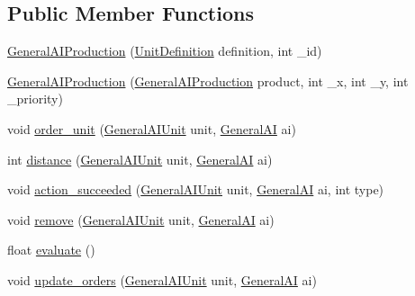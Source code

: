 \subsection*{Public Member Functions}
\begin{DoxyCompactItemize}
\item 
\hyperlink{classai_1_1general_1_1_general_a_i_production_ab1d3fca0db9e7af9a0a9ef09c3bed0a7}{GeneralAIProduction} (\hyperlink{classrts_1_1units_1_1_unit_definition}{UnitDefinition} definition, int \_\-id)
\item 
\hyperlink{classai_1_1general_1_1_general_a_i_production_a8cf7d1c830fd72f02103ab9a39fdf762}{GeneralAIProduction} (\hyperlink{classai_1_1general_1_1_general_a_i_production}{GeneralAIProduction} product, int \_\-x, int \_\-y, int \_\-priority)
\item 
void \hyperlink{classai_1_1general_1_1_general_a_i_production_a7a6cf1e02648e423cfb3860ff4e3ac1c}{order\_\-unit} (\hyperlink{classai_1_1general_1_1_general_a_i_unit}{GeneralAIUnit} unit, \hyperlink{classai_1_1general_1_1_general_a_i}{GeneralAI} ai)
\item 
int \hyperlink{classai_1_1general_1_1_general_a_i_production_a1ce12191227110b21e0822e336f2d3da}{distance} (\hyperlink{classai_1_1general_1_1_general_a_i_unit}{GeneralAIUnit} unit, \hyperlink{classai_1_1general_1_1_general_a_i}{GeneralAI} ai)
\item 
void \hyperlink{classai_1_1general_1_1_general_a_i_production_ad9da9c04211753d7a7a740a0a2aaa410}{action\_\-succeeded} (\hyperlink{classai_1_1general_1_1_general_a_i_unit}{GeneralAIUnit} unit, \hyperlink{classai_1_1general_1_1_general_a_i}{GeneralAI} ai, int type)
\item 
void \hyperlink{classai_1_1general_1_1_general_a_i_production_a0bbe11733d369676b1ed5ab7308dcdb2}{remove} (\hyperlink{classai_1_1general_1_1_general_a_i_unit}{GeneralAIUnit} unit, \hyperlink{classai_1_1general_1_1_general_a_i}{GeneralAI} ai)
\item 
float \hyperlink{classai_1_1general_1_1_general_a_i_production_ac5d7ff5b6f7a6374e2efd5e298c33851}{evaluate} ()
\item 
void \hyperlink{classai_1_1general_1_1_general_a_i_production_a957e8794fc7e461a4a5ee270f891cc0e}{update\_\-orders} (\hyperlink{classai_1_1general_1_1_general_a_i_unit}{GeneralAIUnit} unit, \hyperlink{classai_1_1general_1_1_general_a_i}{GeneralAI} ai)
\end{DoxyCompactItemize}
